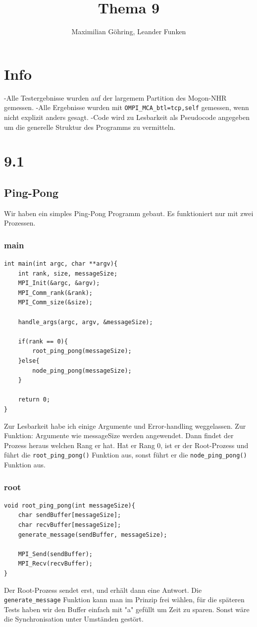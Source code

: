 \documentclass{report}
\title{Thema 9}
\author{Maximilian Göhring, Leander Funken}
\begin{document}
\maketitle

\section*{Info}
-Alle Testergebnisse wurden auf der largemem Partition des Mogon-NHR gemessen.
\newline
-Alle Ergebnisse wurden mit \verb|OMPI_MCA_btl=tcp,self| gemessen, wenn nicht 
explizit anders gesagt.
\newline
-Code wird zu Lesbarkeit als Pseudocode angegeben um die generelle Struktur des 
Programms zu vermitteln. 
\newpage
\section*{9.1}
\subsection*{Ping-Pong}
Wir haben ein simples Ping-Pong Programm gebaut. Es funktioniert nur mit zwei 
Prozessen.
\subsubsection*{main}
\begin{lstlisting}
int main(int argc, char **argv){
    int rank, size, messageSize;
    MPI_Init(&argc, &argv);
    MPI_Comm_rank(&rank);
    MPI_Comm_size(&size);

    handle_args(argc, argv, &messageSize);

    if(rank == 0){
        root_ping_pong(messageSize);
    }else{
        node_ping_pong(messageSize);
    }

    return 0;
}
\end{lstlisting}
Zur Lesbarkeit habe ich einige Argumente und Error-handling weggelassen.
Zur Funktion:
Argumente wie messageSize werden angewendet. Dann findet der Prozess heraus 
welchen Rang er hat. Hat er Rang 0, ist er der Root-Prozess
und führt die \verb|root_ping_pong()| Funktion aus, sonst führt er die
\verb|node_ping_pong()| Funktion aus.
\subsubsection*{root}
\begin{lstlisting}
void root_ping_pong(int messageSize){
    char sendBuffer[messageSize];
    char recvBuffer[messageSize];
    generate_message(sendBuffer, messageSize);

    MPI_Send(sendBuffer);
    MPI_Recv(recvBuffer);
}
\end{lstlisting}
Der Root-Prozess sendet erst, und erhält dann eine Antwort. Die 
\verb|generate_message| Funktion
kann man im Prinzip frei wählen, für die späteren Tests haben wir den Buffer 
einfach mit "a" gefüllt um Zeit zu sparen.
Sonst wäre die Synchronisation unter Umständen gestört.
\end{document}
